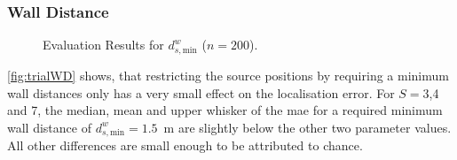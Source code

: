 \subsubsection*{Wall Distance}

\begin{figure}[H]
\iftoggle{quick}{%
    \texttt{[image: plots/boxplots/boxplot-joined-wd]}
}{%
    
}   
	\caption[Evaluation Results for $d^w_{s,\text{min}}$]{Evaluation Results for $d^w_{s,\text{min}}$ ($n=200$).}
	\label{fig:trialWD}
\end{figure}

\autoref{fig:trialWD} shows, that restricting the source positions by requiring a minimum wall distances only has a very small effect on the localisation error. For $S=3$,4 and 7, the median, mean and upper whisker of the \gls{mae} for a required minimum wall distance of $d_{s,\text{min}}^w=1.5$~m are slightly below the other two parameter values. All other differences are small enough to be attributed to chance.